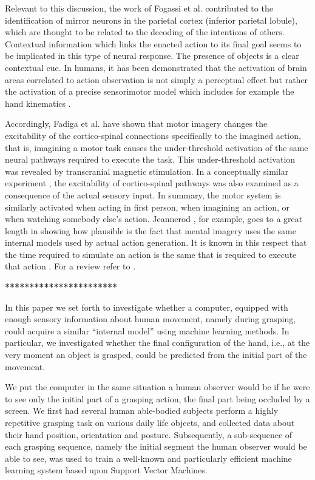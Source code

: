 Relevant to this discussion, the work of Fogassi et
al. \cite{fogassi-05} contributed to the identification of mirror
neurons in the parietal cortex (inferior parietal lobule), which are
thought to be related to the decoding of the intentions of
others. Contextual information which links the enacted action to its
final goal seems to be implicated in this type of neural response. The
presence of objects is a clear contextual cue. In humans, it has been
demonstrated that the activation of brain areas correlated to action
observation is not simply a perceptual effect but rather the
activation of a precise sensorimotor model which includes for example
the hand kinematics \cite{pozzo-06}.
 
Accordingly, Fadiga et al. \cite{fadiga-99,vargas-04} have shown that
motor imagery changes the excitability of the cortico-spinal
connections specifically to the imagined action, that is, imagining a
motor task causes the under-threshold activation of the same neural
pathways required to execute the task. This under-threshold activation
was revealed by transcranial magnetic stimulation. In a conceptually
similar experiment \cite{fadiga-05}, the excitability of
cortico-spinal pathways was also examined as a consequence of the
actual sensory input. In summary, the motor system is similarly
activated when acting in first person, when imagining an action, or
when watching somebody else's action. Jeannerod \cite{jeannerod-88},
for example, goes to a great length in showing how plausible is the
fact that mental imagery uses the same internal models used by actual
action generation.  It is known in this respect that the time required
to simulate an action is the same that is required to execute that
action \cite{sirigu-96}. For a review refer to \cite{jeannerod-99}.

{\bf ************************ }

In this paper we set forth to investigate whether a computer, equipped
with enough sensory information about human movement, namely during
grasping, could acquire a similar ``internal model'' using machine
learning methods. In particular, we investigated whether the final
configuration of the hand, i.e., at the very moment an object is
grasped, could be predicted from the initial part of the movement.

We put the computer in the same situation a human observer would be if
he were to see only the initial part of a grasping action, the final
part being occluded by a screen. We first had several human
able-bodied subjects perform a highly repetitive grasping task on
various daily life objects, and collected data about their hand
position, orientation and posture. Subsequently, a sub-sequence of
each grasping sequence, namely the initial segment the human observer
would be able to see, was used to train a well-known and particularly
efficient machine learning system based upon Support Vector Machines.

